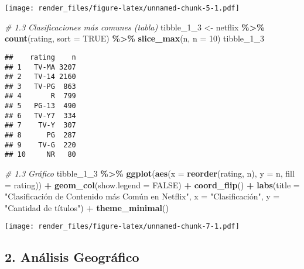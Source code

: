 \documentclass[
]{article}
\newenvironment{Shaded}{\begin{snugshade}}{\end{snugshade}}
\newcommand{\AttributeTok}[1]{\textcolor[rgb]{0.13,0.29,0.53}{#1}}
\newcommand{\CommentTok}[1]{\textcolor[rgb]{0.56,0.35,0.01}{\textit{#1}}}
\newcommand{\ConstantTok}[1]{\textcolor[rgb]{0.56,0.35,0.01}{#1}}
\newcommand{\DecValTok}[1]{\textcolor[rgb]{0.00,0.00,0.81}{#1}}
\newcommand{\FunctionTok}[1]{\textcolor[rgb]{0.13,0.29,0.53}{\textbf{#1}}}
\newcommand{\NormalTok}[1]{#1}
\newcommand{\OtherTok}[1]{\textcolor[rgb]{0.56,0.35,0.01}{#1}}
\newcommand{\SpecialCharTok}[1]{\textcolor[rgb]{0.81,0.36,0.00}{\textbf{#1}}}
\newcommand{\StringTok}[1]{\textcolor[rgb]{0.31,0.60,0.02}{#1}}
\begin{document}
\texttt{[image: render\_files/figure-latex/unnamed-chunk-5-1.pdf]}

\begin{Shaded}
\begin{Highlighting}[]
\CommentTok{\# 1.3 Clasificaciones más comunes (tabla)}
\NormalTok{tibble\_1\_3 }\OtherTok{\textless{}{-}}\NormalTok{ netflix }\SpecialCharTok{\%\textgreater{}\%}
  \FunctionTok{count}\NormalTok{(rating, }\AttributeTok{sort =} \ConstantTok{TRUE}\NormalTok{) }\SpecialCharTok{\%\textgreater{}\%}
  \FunctionTok{slice\_max}\NormalTok{(n, }\AttributeTok{n =} \DecValTok{10}\NormalTok{)}
\NormalTok{tibble\_1\_3}
\end{Highlighting}
\end{Shaded}

\begin{verbatim}
##    rating    n
## 1   TV-MA 3207
## 2   TV-14 2160
## 3   TV-PG  863
## 4       R  799
## 5   PG-13  490
## 6   TV-Y7  334
## 7    TV-Y  307
## 8      PG  287
## 9    TV-G  220
## 10     NR   80
\end{verbatim}

\begin{Shaded}
\begin{Highlighting}[]
\CommentTok{\# 1.3 Gráfico}
\NormalTok{tibble\_1\_3 }\SpecialCharTok{\%\textgreater{}\%}
  \FunctionTok{ggplot}\NormalTok{(}\FunctionTok{aes}\NormalTok{(}\AttributeTok{x =} \FunctionTok{reorder}\NormalTok{(rating, n), }\AttributeTok{y =}\NormalTok{ n, }\AttributeTok{fill =}\NormalTok{ rating)) }\SpecialCharTok{+}
  \FunctionTok{geom\_col}\NormalTok{(}\AttributeTok{show.legend =} \ConstantTok{FALSE}\NormalTok{) }\SpecialCharTok{+}
  \FunctionTok{coord\_flip}\NormalTok{() }\SpecialCharTok{+}
  \FunctionTok{labs}\NormalTok{(}\AttributeTok{title =} \StringTok{"Clasificación de Contenido más Común en Netflix"}\NormalTok{,}
       \AttributeTok{x =} \StringTok{"Clasificación"}\NormalTok{, }\AttributeTok{y =} \StringTok{"Cantidad de títulos"}\NormalTok{) }\SpecialCharTok{+}
  \FunctionTok{theme\_minimal}\NormalTok{()}
\end{Highlighting}
\end{Shaded}

\texttt{[image: render\_files/figure-latex/unnamed-chunk-7-1.pdf]}

\subsection{2. Análisis Geográfico}\label{anuxe1lisis-geogruxe1fico}
\end{document}
